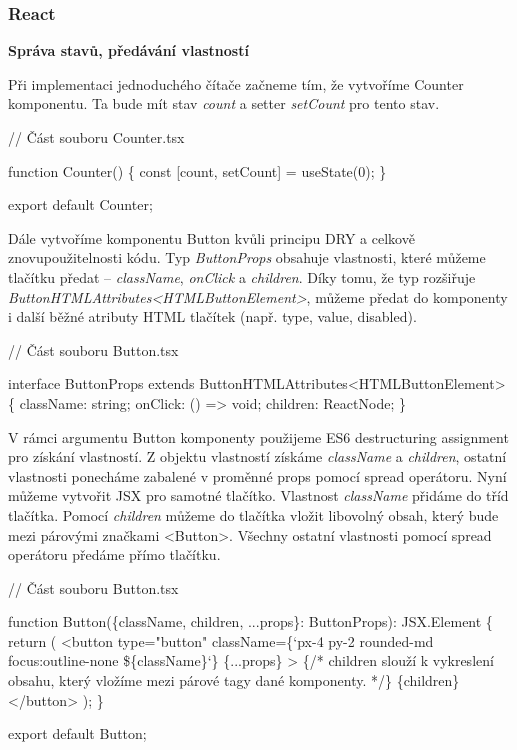 \subsubsection{React}

\begin{flushleft}
  \textbf{Správa stavů, předávání vlastností}
\end{flushleft}

Při implementaci jednoduchého čítače začneme tím, že vytvoříme Counter komponentu. Ta bude mít stav \emph{count} a setter \emph{setCount} pro tento stav.

\begin{prog}
// Část souboru Counter.tsx

function Counter() \{
  const [count, setCount] = useState(0);
\}

export default Counter;
\end{prog}

Dále vytvoříme komponentu Button kvůli principu DRY a celkově znovupoužitelnosti kódu. 
Typ \emph{ButtonProps} obsahuje vlastnosti, které můžeme tlačítku předat -- \emph{className}, \emph{onClick} a \emph{children}. 
Díky tomu, že typ rozšiřuje \emph{ButtonHTMLAttributes<HTMLButtonElement>}, můžeme předat do komponenty i další běžné atributy HTML tlačítek (např. type, value, disabled).

\begin{prog}
// Část souboru Button.tsx

interface ButtonProps extends ButtonHTMLAttributes<HTMLButtonElement> \{
  className: string;
  onClick: () => void;
  children: ReactNode;
\}
\end{prog}

V rámci argumentu Button komponenty použijeme ES6 destructuring assignment pro získání vlastností. 
Z objektu vlastností získáme \emph{className} a \emph{children}, ostatní vlastnosti ponecháme zabalené v proměnné props pomocí spread operátoru. 
Nyní můžeme vytvořit JSX pro samotné tlačítko. Vlastnost \emph{className} přidáme do tříd tlačítka. 
Pomocí \emph{children} můžeme do tlačítka vložit libovolný obsah, který bude mezi párovými značkami <Button>. 
Všechny ostatní vlastnosti pomocí spread operátoru předáme přímo tlačítku.

\begin{prog}
// Část souboru Button.tsx

function Button(\{className, children, ...props\}: ButtonProps): JSX.Element \{
  return (
    <button
      type="button"
      className=\{`px-4 py-2 rounded-md focus:outline-none \$\{className\}`\}
      \{...props\}
    >
      \{/* children slouží k vykreslení obsahu, 
        který vložíme mezi párové tagy dané komponenty. */\}
      \{children\}
    </button>
  );
\}

export default Button;
\end{prog}

